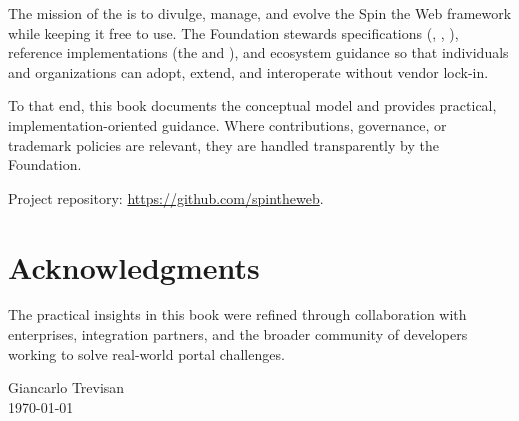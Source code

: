 The mission of the \organization{} is to divulge, manage, and evolve the Spin the Web framework while keeping it free to use. The Foundation stewards specifications (\wbdl, \wbpl, \wbll), reference implementations (the \webspinner and \studio), and ecosystem guidance so that individuals and organizations can adopt, extend, and interoperate without vendor lock-in.

To that end, this book documents the conceptual model and provides practical, implementation-oriented guidance. Where contributions, governance, or trademark policies are relevant, they are handled transparently by the Foundation.

Project repository: \url{https://github.com/spintheweb}.

\section*{Acknowledgments}

The practical insights in this book were refined through collaboration with enterprises, integration partners, and the broader community of developers working to solve real-world portal challenges.

\vspace{1cm}
\nopagebreak
\hfill Giancarlo Trevisan \\
\hfill \today
